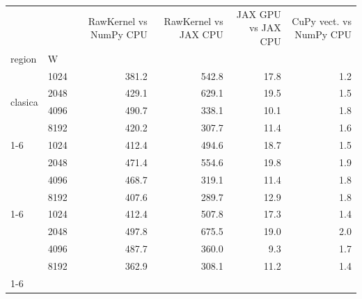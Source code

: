 \begin{tabular}{llrrrr}
\toprule
 &  & RawKernel vs NumPy CPU & RawKernel vs JAX CPU & JAX GPU vs JAX CPU & CuPy vect. vs NumPy CPU \\
region & W &  &  &  &  \\
\midrule
\multirow[t]{4}{*}{clasica} & 1024 & 381.2 & 542.8 & 17.8 & 1.2 \\
 & 2048 & 429.1 & 629.1 & 19.5 & 1.5 \\
 & 4096 & 490.7 & 338.1 & 10.1 & 1.8 \\
 & 8192 & 420.2 & 307.7 & 11.4 & 1.6 \\
\cline{1-6}
\multirow[t]{4}{*}{frontera_central} & 1024 & 412.4 & 494.6 & 18.7 & 1.5 \\
 & 2048 & 471.4 & 554.6 & 19.8 & 1.9 \\
 & 4096 & 468.7 & 319.1 & 11.4 & 1.8 \\
 & 8192 & 407.6 & 289.7 & 12.9 & 1.8 \\
\cline{1-6}
\multirow[t]{4}{*}{frontera_lateral} & 1024 & 412.4 & 507.8 & 17.3 & 1.4 \\
 & 2048 & 497.8 & 675.5 & 19.0 & 2.0 \\
 & 4096 & 487.7 & 360.0 & 9.3 & 1.7 \\
 & 8192 & 362.9 & 308.1 & 11.2 & 1.4 \\
\cline{1-6}
\bottomrule
\end{tabular}
